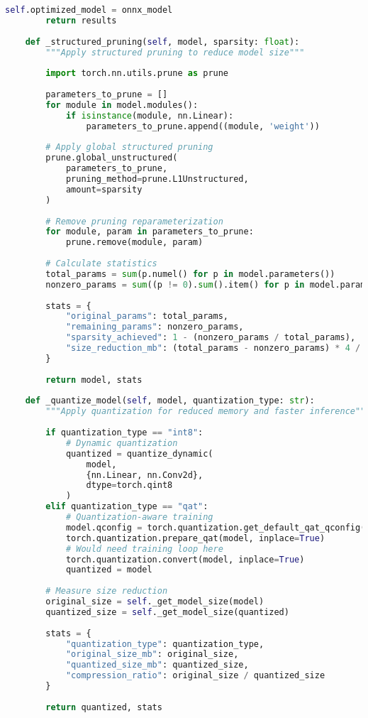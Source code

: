 \documentclass[11pt,a4paper]{article}
\begin{document}
\begin{lstlisting}[language=Python, caption=Edge Optimization Pipeline]
        self.optimized_model = onnx_model
        return results
    
    def _structured_pruning(self, model, sparsity: float):
        """Apply structured pruning to reduce model size"""
        
        import torch.nn.utils.prune as prune
        
        parameters_to_prune = []
        for module in model.modules():
            if isinstance(module, nn.Linear):
                parameters_to_prune.append((module, 'weight'))
        
        # Apply global structured pruning
        prune.global_unstructured(
            parameters_to_prune,
            pruning_method=prune.L1Unstructured,
            amount=sparsity
        )
        
        # Remove pruning reparameterization
        for module, param in parameters_to_prune:
            prune.remove(module, param)
        
        # Calculate statistics
        total_params = sum(p.numel() for p in model.parameters())
        nonzero_params = sum((p != 0).sum().item() for p in model.parameters())
        
        stats = {
            "original_params": total_params,
            "remaining_params": nonzero_params,
            "sparsity_achieved": 1 - (nonzero_params / total_params),
            "size_reduction_mb": (total_params - nonzero_params) * 4 / (1024 * 1024)
        }
        
        return model, stats
    
    def _quantize_model(self, model, quantization_type: str):
        """Apply quantization for reduced memory and faster inference"""
        
        if quantization_type == "int8":
            # Dynamic quantization
            quantized = quantize_dynamic(
                model,
                {nn.Linear, nn.Conv2d},
                dtype=torch.qint8
            )
        elif quantization_type == "qat":
            # Quantization-aware training
            model.qconfig = torch.quantization.get_default_qat_qconfig('fbgemm')
            torch.quantization.prepare_qat(model, inplace=True)
            # Would need training loop here
            torch.quantization.convert(model, inplace=True)
            quantized = model
        
        # Measure size reduction
        original_size = self._get_model_size(model)
        quantized_size = self._get_model_size(quantized)
        
        stats = {
            "quantization_type": quantization_type,
            "original_size_mb": original_size,
            "quantized_size_mb": quantized_size,
            "compression_ratio": original_size / quantized_size
        }
        
        return quantized, stats
\end{lstlisting}
\end{document}
